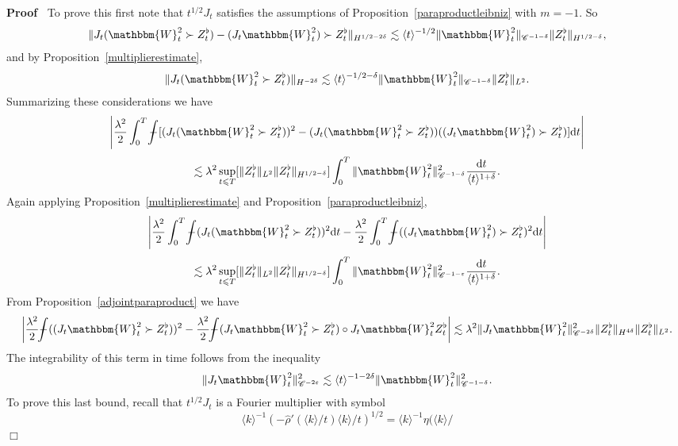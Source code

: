 \documentclass[11pt, oneside]{article}   	%
\newcommand{\mathd}{\mathrm{d}}
\newenvironment{proof}{\noindent\textbf{Proof\ }}{\hspace*{\fill}$\Box$\medskip}
\def\Xint#1{\mathchoice
{\XXint\displaystyle\textstyle{#1}}%
{\XXint\textstyle\scriptstyle{#1}}%
{\XXint\scriptstyle\scriptscriptstyle{#1}}%
{\XXint\scriptscriptstyle\scriptscriptstyle{#1}}%
\!\int}
\def\XXint#1#2#3{{\setbox0=\hbox{$#1{#2#3}{\int}$ }
\vcenter{\hbox{$#2#3$ }}\kern-.6\wd0}}
\def\dashint{\Xint-}
\newcommand{\bint}{\dashint}
\newcommand{\VV}{\mathscr{C}}
\begin{document}
\begin{proof}
  To prove this first note that $t^{1 / 2} J_t$ satisfies the assumptions of
  Proposition~\ref{paraproductleibniz} with $m = - 1$. So
  \[ \| J_t (\mathbbm{W}^2_t \succ Z^{\flat}_t) - (J_t \mathbbm{W}^2_t) \succ
     Z^{\flat}_t \|_{H^{1 / 2 - 2 \delta}} \lesssim \langle t \rangle^{- 1 /
     2} \| \mathbbm{W}^2_t \|_{\VV^{- 1 - \delta}} \| Z^{\flat}_t  \|_{H^{1 /
     2 - \delta}}, \]
  and by Proposition~\ref{multiplierestimate},
  \[ \| J_t (\mathbbm{W}^2_t \succ Z^{\flat}_t) \|_{H^{- 2 \delta}} \lesssim
     \langle t \rangle^{- 1 / 2 - \delta} \| \mathbbm{W}^2_t \|_{\VV^{- 1 -
     \delta}} \| Z^{\flat}_t  \|_{L^2} . \]
  Summarizing these considerations we have
  \[ \left| \frac{\lambda^2}{2} \int_0^T \bint [(J_t (\mathbbm{W}^2_t \succ
     Z^{\flat}_t))^2 - (J_t (\mathbbm{W}^2_t \succ Z^{\flat}_t)) ((J_t
     \mathbbm{W}^2_t) \succ Z^{\flat}_t)] \mathd t \right| \]
  \[ \lesssim \lambda^2 \sup_{t \leqslant T}  [\| Z^{\flat}_t  \|_{L^2} \|
     Z^{\flat}_t  \|_{H^{1 / 2 - \delta}}] \int_0^T \| \mathbbm{W}^2_t
     \|^2_{\VV^{- 1 - \delta}} \frac{\mathd t}{\langle t \rangle^{1 + \delta}}
     . \]
  Again applying Proposition~\ref{multiplierestimate} and
  Proposition~\ref{paraproductleibniz},
  \[ \left| \frac{\lambda^2}{2} \int_0^T \bint (J_t (\mathbbm{W}^2_t \succ
     Z^{\flat}_t))^2 \mathd t - \frac{\lambda^2}{2} \int_0^T \bint ((J_t
     \mathbbm{W}^2_t) \succ Z^{\flat}_t )^2 \mathd t \right| \]
  \[ \lesssim \lambda^2 \sup_{t \leqslant T}  [\| Z^{\flat}_t  \|_{L^2} \|
     Z^{\flat}_t  \|_{H^{1 / 2 - \delta}}] \int_0^T \| \mathbbm{W}^2_t
     \|^2_{\VV^{- 1 - \varepsilon}} \frac{\mathd t}{\langle t \rangle^{1 +
     \delta}} . \]
  From Proposition~\ref{adjointparaproduct} we have
  \[ \left| \frac{\lambda^2}{2} \bint ((J_t \mathbbm{W}^2_t \succ
     Z^{\flat}_t))^2 - \frac{\lambda^2}{2} \bint (J_t \mathbbm{W}^2_t \succ
     Z^{\flat}_t) \circ J_t \mathbbm{W}^2_t Z^{\flat}_t \right| \lesssim
     \lambda^2 \| J_t \mathbbm{W}^2_t \|_{\VV^{- 2 \delta}}^2  \| Z^{\flat}_t
     \|_{H^{4 \delta}}  \| Z^{\flat}_t \|_{L^2} . \]
  The integrability of this term in time follows from the inequality
  \[ \| J_t \mathbbm{W}^2_t \|_{\VV^{- 2 \varepsilon}}^2 \lesssim \langle t
     \rangle^{- 1 - 2 \delta} \| \mathbbm{W}^2_t \|_{\VV^{- 1 - \delta}}^2 .
  \]
  To prove this last bound, recall that $t^{1 / 2} J_t$ is a Fourier
  multiplier with symbol
  \[ \langle k \rangle^{- 1} (- \hat{\rho}' (\langle k \rangle / t) \langle k
     \rangle / t)^{1 / 2} = \langle k \rangle^{- 1} \eta (\langle k \rangle /
\]
\end{proof}
\end{document}

